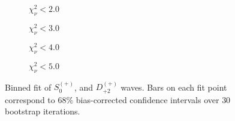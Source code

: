 \begin{figure}[htbp]
    \centering
    \begin{subfigure}{0.45\textwidth}
        
        \caption{$\chi^2_\nu < 2.0$}
    \end{subfigure}
    \hfill
    \begin{subfigure}{0.45\textwidth}
        
        \caption{$\chi^2_\nu < 3.0$}
    \end{subfigure}
    \vspace{1em}
    \begin{subfigure}{0.45\textwidth}
        
        \caption{$\chi^2_\nu < 4.0$}
    \end{subfigure}
    \hfill
    \begin{subfigure}{0.45\textwidth}
        
        \caption{$\chi^2_\nu < 5.0$}
    \end{subfigure}

    \caption{Binned fit of $S_{0}^{(+)}$, and $D_{+2}^{(+)}$ waves. Bars on each fit point correspond to $68\%$ bias-corrected confidence intervals over $ 30 $ bootstrap iterations.}
    \label{fig:binned-fit-all-Sp-D2p}
\end{figure}

